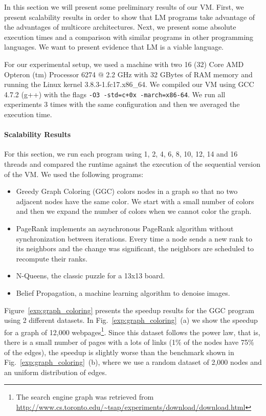 In this section we will present some preliminary results of our VM.
First, we present scalability results in order to show that LM programs take advantage of the advantages of multicore architectures.
Next, we present some absolute execution times and a comparison with similar programs in other programming languages.
We want to present evidence that LM is a viable language.

For our experimental setup, we used a machine 
with two 16 (32) Core AMD Opteron
(tm) Processor 6274 $@$ 2.2 GHz with 32 GBytes of RAM memory and running the Linux
kernel 3.8.3-1.fc17.x86\_64.
     We compiled our VM using GCC 4.7.2 (g++) with the flags \texttt{-O3 -std=c+0x -march=x86-64}.
     We run all experiments 3 times with the same configuration and then we averaged the execution time.
     
\paragraph{Scalability Results}

For this section, we run each program using 1, 2, 4, 6, 8, 10, 12, 14 and 16 threads and compared the runtime against the execution of the sequential version of the VM. We used the following programs:

\newcommand{\figsize}[0]{6.5cm}
\captionsetup[sub]{              %
       font=scriptsize}

\begin{itemize}
   \item Greedy Graph Coloring (GGC) colors nodes in a graph so that no two adjacent nodes have the same color. We start with a small number of colors and then we expand the number of colors when we cannot color the graph.
   \item PageRank implements an asynchronous PageRank algorithm without synchronization between iterations. Every time a node sends a new rank to its neighbors and the change was significant, the neighbors are scheduled to recompute their ranks.
   \item N-Queens, the classic puzzle for a 13x13 board.
   \item Belief Propagation, a machine learning algorithm to denoise images.
\end{itemize}

Figure~\ref{exp:graph_coloring} presents the speedup results for the GGC program using 2 different datasets. In Fig.~\ref{exp:graph_coloring}~(a) we show the speedup for a graph of 12,000 webpages\footnote{The search engine graph was retrieved from \url{http://www.cs.toronto.edu/~tsap/experiments/download/download.html}}. Since this dataset follows the power law, that is, there is a small number of pages with a lots of links (1\% of the nodes have 75\% of the edges), the speedup is slightly worse than the benchmark shown in Fig.~\ref{exp:graph_coloring}~(b), where we use a random dataset of 2,000 nodes and an uniform distribution of edges.

